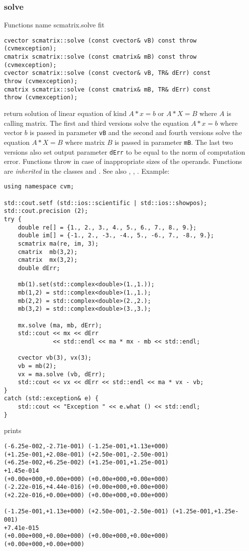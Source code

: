 \subsubsection{solve}
Functions%
\pdfdest name {scmatrix.solve} fit
\begin{verbatim}
cvector scmatrix::solve (const cvector& vB) const throw (cvmexception);
cmatrix scmatrix::solve (const cmatrix& mB) const throw (cvmexception);
cvector scmatrix::solve (const cvector& vB, TR& dErr) const
throw (cvmexception);
cmatrix scmatrix::solve (const cmatrix& mB, TR& dErr) const
throw (cvmexception);
\end{verbatim}
return  solution of  linear equation of kind $A*x=b$ or $A*X=B$
where $A$ is  calling matrix. The first and third versions
solve the equation $A*x=b$ where vector $b$ is passed in 
parameter \verb"vB"
and the second and fourth versions
solve the equation $A*X=B$ where matrix $B$ is passed 
in parameter \verb"mB".
The last two versions also set output parameter \verb"dErr" to be equal
to the norm of computation error.
Functions throw 
in case of inappropriate sizes of the operands.
Functions are \emph{inherited} in the classes
and .
See also
,
,
.
Example:
\begin{Verbatim}
using namespace cvm;

std::cout.setf (std::ios::scientific | std::ios::showpos);
std::cout.precision (2);
try {
    double re[] = {1., 2., 3., 4., 5., 6., 7., 8., 9.};
    double im[] = {-1., 2., -3., -4., 5., -6., 7., -8., 9.};
    scmatrix ma(re, im, 3);
    cmatrix  mb(3,2);
    cmatrix  mx(3,2);
    double dErr;

    mb(1).set(std::complex<double>(1.,1.));
    mb(1,2) = std::complex<double>(1.,1.);
    mb(2,2) = std::complex<double>(2.,2.);
    mb(3,2) = std::complex<double>(3.,3.);

    mx.solve (ma, mb, dErr);
    std::cout << mx << dErr 
              << std::endl << ma * mx - mb << std::endl;

    cvector vb(3), vx(3);
    vb = mb(2);
    vx = ma.solve (vb, dErr);
    std::cout << vx << dErr << std::endl << ma * vx - vb;
}
catch (std::exception& e) {
    std::cout << "Exception " << e.what () << std::endl;
}
\end{Verbatim}
prints
\begin{Verbatim}
(-6.25e-002,-2.71e-001) (-1.25e-001,+1.13e+000)
(+1.25e-001,+2.08e-001) (+2.50e-001,-2.50e-001)
(+6.25e-002,+6.25e-002) (+1.25e-001,+1.25e-001)
+1.45e-014
(+0.00e+000,+0.00e+000) (+0.00e+000,+0.00e+000)
(-2.22e-016,+4.44e-016) (+0.00e+000,+0.00e+000)
(+2.22e-016,+0.00e+000) (+0.00e+000,+0.00e+000)

(-1.25e-001,+1.13e+000) (+2.50e-001,-2.50e-001) (+1.25e-001,+1.25e-001)
+7.41e-015
(+0.00e+000,+0.00e+000) (+0.00e+000,+0.00e+000) (+0.00e+000,+0.00e+000)
\end{Verbatim}
\newpage





